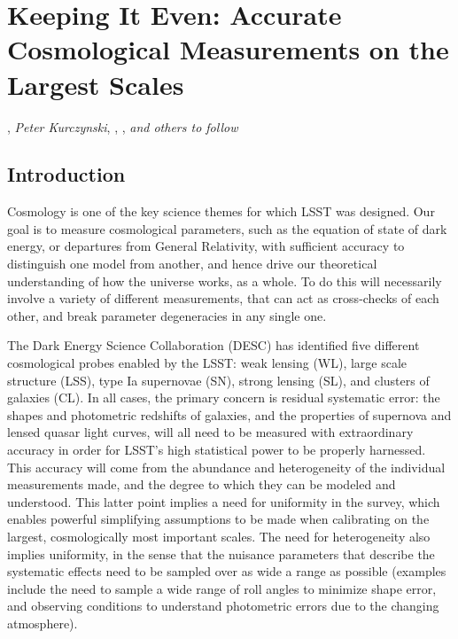 
\chapter[Cosmology]{Keeping It Even: Accurate Cosmological Measurements on the Largest Scales}
\def\chpname{cosmo}\label{chp:\chpname}

,
{\it Peter Kurczynski},
,
,
{\it and others to follow}


\section{Introduction}
\label{sec:\chpname:intro}


Cosmology is one of the key science themes for which LSST was designed. Our goal is to measure cosmological parameters, such as the equation of state of dark energy, or departures from General Relativity, with sufficient accuracy to distinguish one model from another, and hence drive our theoretical understanding of how the universe works, as a whole. To do this will necessarily involve a variety of different measurements, that can act as cross-checks of each other, and break parameter degeneracies in any single one.

The  Dark Energy Science Collaboration (DESC) has identified five
different cosmological probes enabled by the LSST: weak lensing (WL),
large scale structure (LSS), type Ia supernovae (SN), strong lensing
(SL), and clusters of galaxies (CL). In all cases, the primary concern
is residual systematic error: the shapes and photometric redshifts of
galaxies, and the properties of supernova and lensed quasar light
curves, will all need to be measured with extraordinary accuracy in order for LSST's high statistical power to be properly harnessed. This accuracy will come from the abundance and heterogeneity of the individual measurements made, and the degree to which they can be modeled and understood. This latter point implies a need for uniformity in the survey, which enables powerful simplifying assumptions to be made when calibrating on the largest, cosmologically most important scales. The need for heterogeneity also implies  uniformity, in the sense that the nuisance parameters that describe the systematic effects need to be sampled over as wide a range as possible (examples include the need to sample a wide range of roll angles to minimize shape error, and observing conditions to understand photometric errors due to the changing atmosphere).

